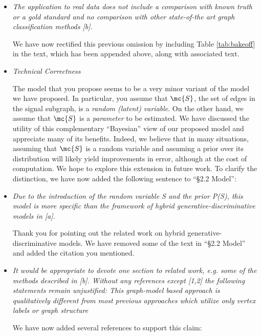 \documentclass[11pt]{article}
\begin{document}
\begin{itemize}
	\item \emph{The application to real data does not include a comparison with known truth or a gold standard and no comparison with other state-of-the art graph classification methods [b].}
	
	We have now rectified this previous omission by including Table \ref{tab:bakeoff} in the text, which has been appended above, along with associated text.

	\item \emph{Technical Correctness}

	The model that you propose seems to be a very minor variant of the model we have proposed.  In particular, you assume that $\mc{S}$, the set of edges in the signal subgraph, is a \emph{random (latent) variable}.  On the other hand, we assume that $\mc{S}$ is a \emph{parameter} to be estimated.  We have discussed the utility of this complementary ``Bayesian'' view of our proposed model and appreciate many of its benefits.  Indeed, we believe that in many situations, assuming that $\mc{S}$ is a random variable and assuming a prior over its distribution will likely yield improvements in error, although at the cost of computation.  We hope to explore this extension in future work.  To clarify the distinction, we have now added the following sentence to ``\S 2.2 Model'':
	
	
	\item \emph{Due to the introduction of the random variable S and the prior P(S), this model is more specific than the framework of hybrid generative-discriminative models in [a].}
	
	Thank you for pointing out the related work on hybrid generative-discriminative models.  We have removed some of the text in ``\S 2.2 Model'' and added the citation you mentioned.
	
	\item \emph{It would be appropriate to devote one section to related work, e.g. some of the methods described in [b]. Without any references except [1,2] the following statements remain unjustified: This graph-model based approach is qualitatively different from most previous approaches which utilize only vertex labels or graph structure}

	We have now added several references to support this claim:
	

\end{itemize}
\end{document}
